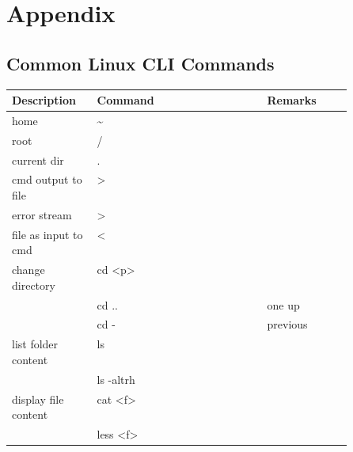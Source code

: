 \section{Appendix}
\subsection{Common Linux CLI Commands}
\renewcommand{\arraystretch}{1.1}
\setlength{\oldtabcolsep}{\tabcolsep}\setlength\tabcolsep{3pt}

{\small %
    \begin{tabularx}{\linewidth}{@{} p{0.25\linewidth}>{\ttfamily}lp{0.25\linewidth} @{}}
        \toprule
        Description          & \normalfont Command        & Remarks                          \\
        \midrule
        home                 & \textasciitilde{}          &                                  \\
        root                 & /                          &                                  \\
        current dir          & .                          &                                  \\
        cmd output to file   & >                          &                                  \\
        error stream         & 2>                         &                                  \\
        file as input to cmd & <                          &                                  \\
        change directory     & cd <p>                     &                                  \\
                             & cd ..                      & one up                           \\
                             & cd -                       & previous                         \\
        list folder content  & ls                         &                                  \\
                             & ls -altrh                  &                                  \\
        display file content & cat <f>                    &                                  \\
                             & less <f>                   &                                  \\

\end{tabularx}}
